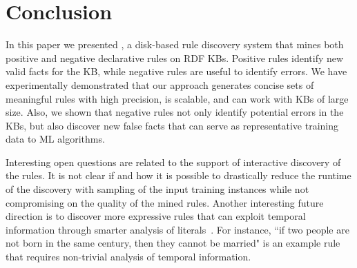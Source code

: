\section{Conclusion}

In this paper we presented \krd, a disk-based rule discovery system that mines both positive and negative declarative rules on RDF KBs. Positive rules identify new valid facts for the KB, while negative rules are useful to identify errors. 
We have experimentally demonstrated that our approach generates concise sets of meaningful rules with high precision,
is scalable, and can work with KBs of large size. 
Also, we shown that negative rules not only identify potential errors in the KBs, but also discover new false facts that can serve as representative training data to ML algorithms.

Interesting open questions are related to the support of interactive discovery of the rules. It is not clear if and how it is possible to drastically reduce the runtime of the discovery with sampling of the input training instances while not compromising on the quality of the mined rules. 
Another interesting future direction is to discover more expressive rules that can exploit temporal information through smarter analysis of literals~\cite{abedjan2015temporal}. For instance, ``if two people are not born in the same century, then they cannot be married" is an example rule that requires non-trivial analysis of temporal information. 



